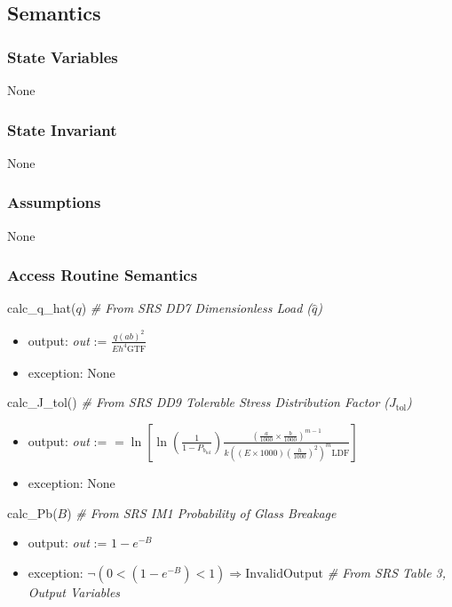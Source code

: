 \documentclass[12pt, titlepage]{article}
\begin{document}
\subsection {Semantics}

\subsubsection {State Variables}

None

\subsubsection {State Invariant}

None

\subsubsection {Assumptions}

None

\subsubsection {Access Routine Semantics}

\noindent calc\_q\_hat($q$) \textit{\# From SRS DD7 Dimensionless Load ($\hat{q}$)}
\begin{itemize}
\item output:  \textit{out} := $\frac{q(ab)^2}{Eh^4\text{GTF}}$
\item exception: None
\end{itemize}

\noindent calc\_J\_tol() \textit{\# From SRS DD9 Tolerable Stress Distribution Factor ($J_\text{tol}$)}
\begin{itemize}
\item output:  \textit{out} := $=\ln[\ln( \frac{1}{1-P_{b_{\text{tol}}}} )
				\frac{(\frac{a}{1000}\times\frac{b}{1000})^{m-1}}
					{k((E \times 1000)(\frac{h}{1000})^2)^m \text{LDF} }]$
\item exception: None
\end{itemize}

\noindent calc\_Pb($B$) \textit{\# From SRS IM1 Probability of Glass Breakage}
\begin{itemize}
\item output:  \textit{out} := $1-e^{-B}$
\item exception: $\neg(0 < (1-e^{-B}) < 1) \Rightarrow
  \mbox{InvalidOutput}$ \textit{\# From SRS Table 3, Output Variables}
\end{itemize}
\end{document}
